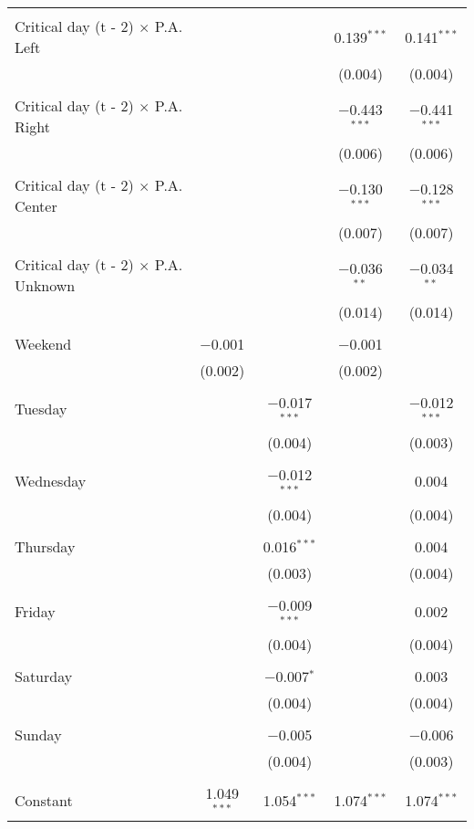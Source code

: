 \documentclass[
]{article}
\begin{document}
\begin{table}[!htbp]
{\begin{tabular}{@{\extracolsep{5pt}}lcccc}
  & & & & \\ 
 Critical day (t - 2) $\times$ P.A. Left &  &  & 0.139$^{***}$ & 0.141$^{***}$ \\ 
  &  &  & (0.004) & (0.004) \\ 
  & & & & \\ 
 Critical day (t - 2) $\times$ P.A. Right &  &  & $-$0.443$^{***}$ & $-$0.441$^{***}$ \\ 
  &  &  & (0.006) & (0.006) \\ 
  & & & & \\ 
 Critical day (t - 2) $\times$ P.A. Center &  &  & $-$0.130$^{***}$ & $-$0.128$^{***}$ \\ 
  &  &  & (0.007) & (0.007) \\ 
  & & & & \\ 
 Critical day (t - 2) $\times$ P.A. Unknown &  &  & $-$0.036$^{**}$ & $-$0.034$^{**}$ \\ 
  &  &  & (0.014) & (0.014) \\ 
  & & & & \\ 
 Weekend & $-$0.001 &  & $-$0.001 &  \\ 
  & (0.002) &  & (0.002) &  \\ 
  & & & & \\ 
 Tuesday &  & $-$0.017$^{***}$ &  & $-$0.012$^{***}$ \\ 
  &  & (0.004) &  & (0.003) \\ 
  & & & & \\ 
 Wednesday &  & $-$0.012$^{***}$ &  & 0.004 \\ 
  &  & (0.004) &  & (0.004) \\ 
  & & & & \\ 
 Thursday &  & 0.016$^{***}$ &  & 0.004 \\ 
  &  & (0.003) &  & (0.004) \\ 
  & & & & \\ 
 Friday &  & $-$0.009$^{***}$ &  & 0.002 \\ 
  &  & (0.004) &  & (0.004) \\ 
  & & & & \\ 
 Saturday &  & $-$0.007$^{*}$ &  & 0.003 \\ 
  &  & (0.004) &  & (0.004) \\ 
  & & & & \\ 
 Sunday &  & $-$0.005 &  & $-$0.006 \\ 
  &  & (0.004) &  & (0.003) \\ 
  & & & & \\ 
 Constant & 1.049$^{***}$ & 1.054$^{***}$ & 1.074$^{***}$ & 1.074$^{***}$ \\ 

\end{tabular}}
\end{table}
\end{document}
